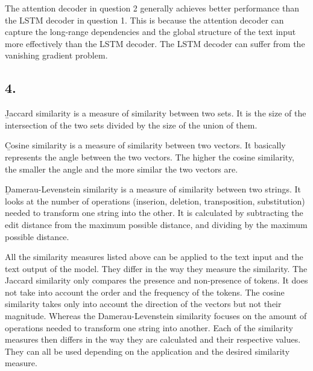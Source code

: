 \documentclass[11pt]{article}
\begin{document}
The attention decoder in question 2 generally achieves better performance than the LSTM decoder in question 1.
This is because the attention decoder can capture the long-range dependencies and the global structure of the text input more effectively than the LSTM decoder.
The LSTM decoder can suffer from the vanishing gradient problem.
\subsection{4.}
\b{Jaccard similarity} is a measure of similarity between two sets.
It is the size of the intersection of the two sets divided by the size of the union of them.

\b{Cosine similarity} is a measure of similarity between two vectors.
It basically represents the angle between the two vectors.
The higher the cosine similarity, the smaller the angle and the more similar the two vectors are.

\b{Damerau-Levenstein similarity} is a measure of similarity between two strings.
It looks at the number of operations (inserion, deletion, transposition, substitution) needed to transform one string into the other.
It is calculated by subtracting the edit distance from the maximum possible distance, and dividing by the maximum possible distance.

All the similarity measures listed above can be applied to the text input and the text output of the model.
They differ in the way they measure the similarity.
The Jaccard similarity only compares the presence and non-presence of tokens.
It does not take into account the order and the frequency of the tokens.
The cosine similarity takes only into account the direction of the vectors but not their magnitude.
Whereas the Damerau-Levenstein similarity focuses on the amount of operations needed to transform one string into another.
Each of the similarity measures then differs in the way they are calculated and their respective values.
They can all be used depending on the application and the desired similarity measure.
\end{document}
